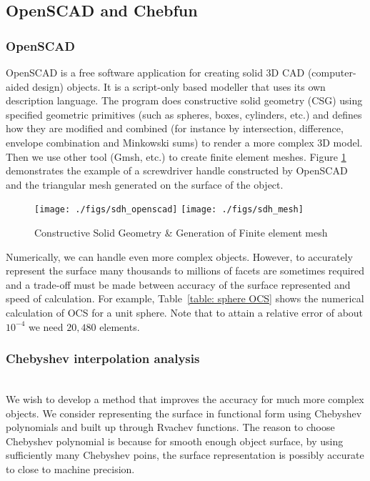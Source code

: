 \documentclass[11pt,reqno]{amsart}
\theoremstyle{definition}
\begin{document}
\subsection{OpenSCAD and Chebfun}
\subsubsection{OpenSCAD}
OpenSCAD is a free software application for creating solid 3D CAD
(computer-aided design) objects. It is a script-only based modeller that uses
its own description language. The program does constructive solid geometry
(CSG) using specified geometric primitives (such as spheres, boxes, cylinders,
etc.) and defines how they are modified and combined (for instance by
intersection, difference, envelope combination and Minkowski sums) to render a
more complex 3D model. Then we use other tool (Gmsh, etc.) to create finite
element meshes. Figure \ref{fig:sdh_openscad} demonstrates the example of
a screwdriver handle constructed by OpenSCAD and the triangular mesh generated on
the surface of the object.

\begin{figure}[H]   	
\centerline{\texttt{[image: ./figs/sdh\_openscad]}
     	\hspace{-6pt}
		\texttt{[image: ./figs/sdh\_mesh]}}
     	\hspace{-6pt}
		\caption{Constructive Solid Geometry \& Generation of Finite element mesh ~\cite{mesh}}
        \label{fig:sdh_openscad}
\end{figure}

Numerically, we can handle even more complex objects. However, to accurately
represent the surface many thousands to millions of facets are sometimes
required and a trade-off must be made between accuracy of the surface
represented and speed of calculation.  For example, Table~\ref{table: sphere
OCS} shows the numerical calculation of OCS for a unit sphere. Note that to
attain a relative error of about $10^{-4}$ we need $20{,}480$ elements.  


\subsubsection{Chebyshev interpolation analysis}~\\
We wish to develop a method that improves the accuracy for much more complex
objects. We consider representing the surface in functional form using
Chebyshev polynomials and built up through Rvachev functions. The reason to
choose Chebyshev polynomial is because for smooth enough object surface, by
using sufficiently many Chebyshev poins, the surface representation is possibly
accurate to close to machine precision.
\end{document}
